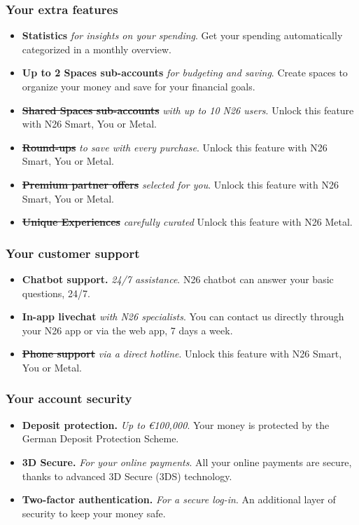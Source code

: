 \documentclass[onsided]{book}
\numberwithin{equation}{section}
\begin{document}
\subsubsection{Your extra features}
\begin{itemize}
    \item \textbf{Statistics} \textit{for insights on your spending}. Get your spending automatically categorized in a monthly overview.
    \item \textbf{Up to 2 Spaces sub-accounts} \textit{for budgeting and saving}. Create spaces to organize your money and save for your financial goals.
    \item \textbf{\st{Shared Spaces sub-accounts}} \textit{with up to 10 N26 users}. Unlock this feature with N26 Smart, You or Metal.
    \item \textbf{\st{Round-ups}} \textit{to save with every purchase}. Unlock this feature with N26 Smart, You or Metal.
    \item \textbf{\st{Premium partner offers}} \textit{selected for you}. Unlock this feature with N26 Smart, You or Metal.
    \item \textbf{\st{Unique Experiences}} \textit{carefully curated} Unlock this feature with N26 Metal.
\end{itemize}

\subsubsection{Your customer support}
\begin{itemize}
    \item \textbf{Chatbot support.} \textit{24/7 assistance}. N26 chatbot can answer your basic questions, 24/7.
    \item \textbf{In-app livechat} \textit{with N26 specialists}. You can contact us directly through your N26 app or via the web app, 7 days a week.
    \item \textbf{\st{Phone support}} \textit{via a direct hotline}. Unlock this feature with N26 Smart, You or Metal.
\end{itemize}

\subsubsection{Your account security}
\begin{itemize}
    \item \textbf{Deposit protection.} \textit{Up to €100,000}. Your money is protected by the German Deposit Protection Scheme.
    \item \textbf{3D Secure.} \textit{For your online payments}. All your online payments are secure, thanks to advanced 3D Secure (3DS) technology.
    \item \textbf{Two-factor authentication.} \textit{For a secure log-in}. An additional layer of security to keep your money safe.
\end{itemize}
\end{document}
